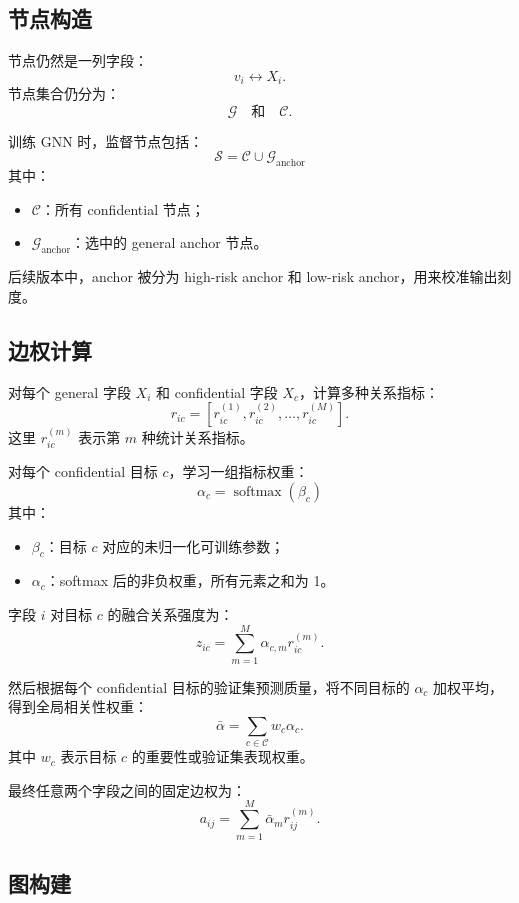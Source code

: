 \documentclass[UTF8]{ctexart}
\begin{document}
\subsection{节点构造}

节点仍然是一列字段：
\[
v_i \leftrightarrow X_i.
\]
节点集合仍分为：
\[
\mathcal{G} \quad \text{和} \quad \mathcal{C}.
\]

训练 GNN 时，监督节点包括：
\[
\mathcal{S}=\mathcal{C}\cup\mathcal{G}_{\text{anchor}}
\]
其中：
\begin{itemize}
    \item \(\mathcal{C}\)：所有 confidential 节点；
    \item \(\mathcal{G}_{\text{anchor}}\)：选中的 general anchor 节点。
\end{itemize}

后续版本中，anchor 被分为 high-risk anchor 和 low-risk anchor，用来校准输出刻度。

\subsection{边权计算}

对每个 general 字段 \(X_i\) 和 confidential 字段 \(X_c\)，计算多种关系指标：
\[
r_{ic}
=
\left[
r_{ic}^{(1)},r_{ic}^{(2)},\ldots,r_{ic}^{(M)}
\right].
\]
这里 \(r_{ic}^{(m)}\) 表示第 \(m\) 种统计关系指标。

对每个 confidential 目标 \(c\)，学习一组指标权重：
\[
\alpha_c=\operatorname{softmax}(\beta_c)
\]
其中：
\begin{itemize}
    \item \(\beta_c\)：目标 \(c\) 对应的未归一化可训练参数；
    \item \(\alpha_c\)：softmax 后的非负权重，所有元素之和为 1。
\end{itemize}

字段 \(i\) 对目标 \(c\) 的融合关系强度为：
\[
z_{ic}=\sum_{m=1}^{M}\alpha_{c,m}r_{ic}^{(m)}.
\]

然后根据每个 confidential 目标的验证集预测质量，将不同目标的 \(\alpha_c\) 加权平均，得到全局相关性权重：
\[
\bar{\alpha}
=
\sum_{c\in\mathcal{C}}w_c\alpha_c.
\]
其中 \(w_c\) 表示目标 \(c\) 的重要性或验证集表现权重。

最终任意两个字段之间的固定边权为：
\[
a_{ij}
=
\sum_{m=1}^{M}\bar{\alpha}_m r_{ij}^{(m)}.
\]

\subsection{图构建}
\end{document}
